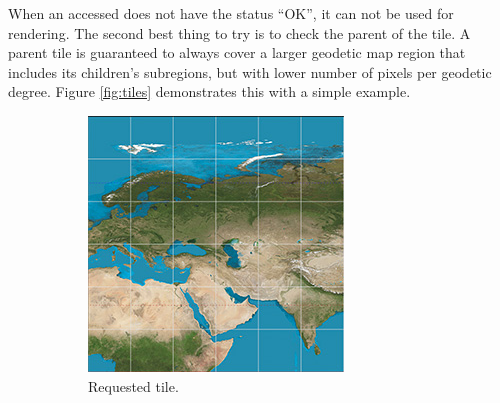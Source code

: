 When an accessed  does not have the status ``OK'', it can not be used for rendering. The second best thing to try is to check the parent of the tile. A parent tile is guaranteed to always cover a larger geodetic map region that includes its children's subregions, but with lower number of pixels per geodetic degree. Figure \ref{fig:tiles} demonstrates this with a simple example.

\begin{figure}[htbp]
    \centering
    \begin{subfigure}[t]{0.3\textwidth}
        \includegraphics[width=\textwidth]{figures/implementation/chunktile/chunktile1.jpg}
        \caption{Requested tile.}
    \end{subfigure}
    \quad
    \begin{subfigure}[t]{0.3\textwidth}

\end{subfigure}
\end{figure}
